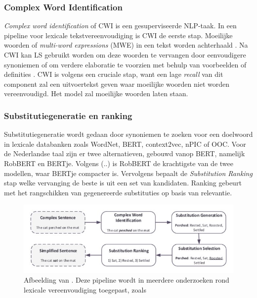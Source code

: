 
\subsubsection{Complex Word Identification}

\textit{Complex word identification} of CWI is een gesuperviseerde NLP-taak. In een pipeline voor lexicale tekstvereenvoudiging is CWI de eerste stap. Moeilijke woorden of \textit{multi-word expressions} (MWE) in een tekst worden achterhaald  \autocite{Shardlow2013, Gooding2019}. Na CWI kan LS gebruikt worden om deze woorden te vervangen door eenvoudigere synoniemen of om verdere elaboratie te voorzien met behulp van voorbeelden of definities \autocite{Zeng2005, Kandula2010}. CWI is volgens \textcite{Shardlow2013} een cruciale stap, want een lage \textit{recall} van dit component zal een uitvoertekst geven waar moeilijke woorden niet worden vereenvoudigd. Het model zal moeilijke woorden laten staan.

\subsubsection{Substitutiegeneratie en ranking}

Substitutiegeneratie wordt gedaan door synoniemen te zoeken voor een doelwoord in lexicale databanken zoals WordNet, BERT, context2vec, nPIC of OOC. Voor de Nederlandse taal zijn er twee alternatieven, gebouwd vanop BERT, namelijk RobBERT en BERTje. Volgens (..) is RobBERT de krachtigste van de twee modellen, waar BERTje compacter is. Vervolgens bepaalt de \textit{Substitution Ranking} stap welke vervanging de beste is uit een set van kandidaten. Ranking gebeurt met het rangschikken van gegenereerde substituties op basis van relevantie.

\begin{figure}[H]
	\includegraphics{img/lexical-simplification-pipeline.png}
	\caption{Afbeelding van \textcite{Althunayyan2021}. Deze pipeline wordt in meerdere onderzoeken rond lexicale vereenvoudiging toegepast, zoals \textcite{Paetzold2016, Bingel2018, Bulte2018}}
\end{figure}

